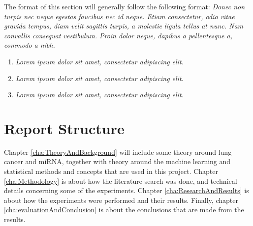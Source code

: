 The format of this section will generally follow the following format:
{\it
Donec non turpis nec neque egestas faucibus nec id neque. Etiam consectetur, odio vitae gravida tempus, diam velit sagittis turpis, a molestie ligula tellus at nunc. Nam convallis consequat vestibulum. Proin dolor neque, dapibus a pellentesque a, commodo a nibh.}

\begin{enumerate}
\item {\it Lorem ipsum dolor sit amet, consectetur adipiscing elit.}
\item {\it Lorem ipsum dolor sit amet, consectetur adipiscing elit.}
\item {\it Lorem ipsum dolor sit amet, consectetur adipiscing elit.}
\end{enumerate}
\fi


\section{Report Structure}
\label{sec:thesisStructure}

Chapter \ref{cha:TheoryAndBackground} will include some theory around lung cancer and miRNA, together with theory around the machine learning and statistical methods and concepts that are used in this project. Chapter \ref{cha:Methodology} is about how the literature search was done, and technical details concerning some of the experiments. Chapter \ref{cha:ResearchAndResults} is about how the experiments were performed and their results. Finally, chapter \ref{cha:evaluationAndConclusion} is about the conclusions that are made from the results.

\iffalse
This section provides the reader with an overview of what is coming in the next chapters. You want to say more than what is explicit in the chapter name, if possible, but still keep the description short and to the point. 
\fi
